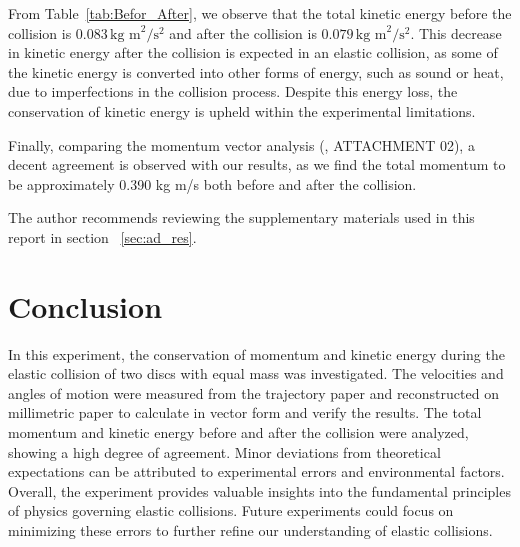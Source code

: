 \documentclass[journal]{IEEEtran}
\begin{document}
From Table~\ref{tab:Befor_After}, we observe that the total kinetic energy before the collision is $0.083 \, \text{kg m}^2/\text{s}^2$ and after the collision is $0.079 \, \text{kg m}^2/\text{s}^2$. This decrease in kinetic energy after the collision is expected in an elastic collision, as some of the kinetic energy is converted into other forms of energy, such as sound or heat, due to imperfections in the collision process. Despite this energy loss, the conservation of kinetic energy is upheld within the experimental limitations.

Finally, comparing the momentum vector analysis (\cite{googledrive}, ATTACHMENT 02), a decent agreement is observed with our results, as we find the total momentum to be approximately 0.390 kg m/s both before and after the collision.

The author recommends reviewing the supplementary materials used in this report in section ~\ref{sec:ad_res}. 
\section{Conclusion}

In this experiment, the conservation of momentum and kinetic energy during the elastic collision of two discs with equal mass was investigated. The velocities and angles of motion were measured from the trajectory paper and reconstructed on millimetric paper to calculate in vector form and verify the results. The total momentum and kinetic energy before and after the collision were analyzed, showing a high degree of agreement. Minor deviations from theoretical expectations can be attributed to experimental errors and environmental factors. Overall, the experiment provides valuable insights into the fundamental principles of physics governing elastic collisions. Future experiments could focus on minimizing these errors to further refine our understanding of elastic collisions.
\end{document}
